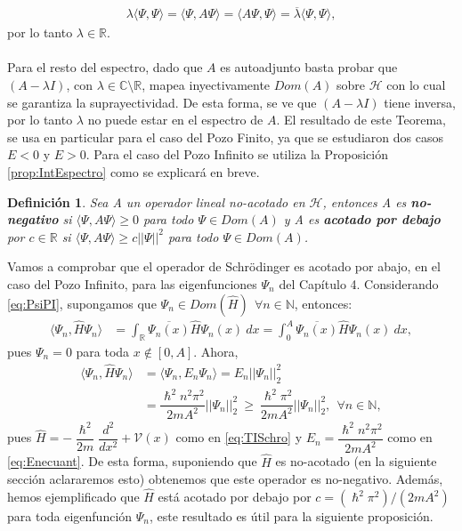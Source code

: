 \documentclass[12pt]{article}
\newtheorem{defn}[teo]{Definición}
\theoremstyle{definition}
\newcommand*{\field}[1]{\mathbb{#1}}
\begin{document}
\begin{align*}
    \lambda\langle\Psi,\Psi\rangle = \langle\Psi,A\Psi\rangle =
    \langle A\Psi,\Psi\rangle = \overline{\lambda}\langle\Psi,\Psi\rangle,
\end{align*}
por lo tanto $\lambda\in\field{R}$.
\\ \\
Para el resto del espectro, dado que $A$ es autoadjunto 
 basta probar que $(A-\lambda I)$, con $\lambda\in\field{C}\setminus\field{R}$, mapea inyectivamente $Dom(A)$ sobre $\mathcal{H}$ con lo cual se garantiza la suprayectividad. De esta forma, se ve que $(A-\lambda I)$ tiene inversa, por lo tanto $\lambda$ no puede estar en el espectro de $A$. El resultado de este Teorema, se usa en particular para el caso del Pozo Finito, ya que se estudiaron dos casos $E<0$ y $E>0$. Para el caso del Pozo Infinito se utiliza la Proposición \ref{prop:IntEspectro} como se explicará en breve.
\begin{defn}
    Sea A un operador lineal no-acotado en $\mathcal{H}$, entonces A es \textbf{no-negativo} si $\langle\Psi,A\Psi\rangle \geq 0$ para todo $\Psi \in Dom(A)$ y A es \textbf{acotado por debajo} por $c\in\field{R}$ si $\langle\Psi,A\Psi\rangle \geq c ||\Psi||^{2}$ para todo $\Psi\in Dom(A)$.
\end{defn}
\noindent
Vamos a comprobar que el operador de Schrödinger es acotado por abajo, en el caso del Pozo Infinito, para las eigenfunciones $\Psi_{n}$ del Capítulo 4. Considerando \eqref{eq:PsiPI}, supongamos que $\Psi_{n}\in Dom(\hat{H})\:\:\forall n\in\field{N}$, entonces:
\begin{align*}
    \langle\Psi_{n}, \hat{H}\Psi_{n}\rangle
    & =
    \int_{\field{R}}\overline{\Psi_{n}(x)}\hat{H}\Psi_{n}(x)\:dx =
    \int_{0}^{A} \overline{\Psi_{n}(x)}\hat{H}\Psi_{n}(x)\:dx,
\end{align*}
    pues $\Psi_{n} = 0$ para toda $x\notin [0,A]$. Ahora, 
    \begin{align*}
    \langle\Psi_{n}, \hat{H}\Psi_{n}\rangle & = 
     \langle\Psi_{n}, E_{n}\Psi_{n}\rangle =
     E_{n}||\Psi_{n}||_{2}^2  \\ & =
    \dfrac{\hslash^2n^2\pi^2}{2mA^2}||\Psi_{n}||_{2}^2 \:\geq\:  \dfrac{\hslash^2\pi^2}{2mA^2}||\Psi_{n}||_{2}^2,\:\:\forall n\in\field{N},
    \end{align*}
    pues $\hat{H} = - \dfrac{\hslash^2}{2m}\dfrac{d^2}{dx^2} + \mathcal{V}(x)$ como en \eqref{eq:TISchro} y $E_{n}=\dfrac{\hslash^2n^2\pi^2}{2mA^2}$ como en \eqref{eq:Enecuant}. De esta forma, suponiendo que $\hat{H}$ es no-acotado (en la siguiente sección aclararemos esto) obtenemos que este operador es no-negativo. Además, hemos ejemplificado que $\hat{H}$ está acotado por debajo por $c = (\hslash^2\pi^2)/(2mA^2)$ para toda eigenfunción $\Psi_{n}$, este resultado es útil para la siguiente proposición.
\end{document}
